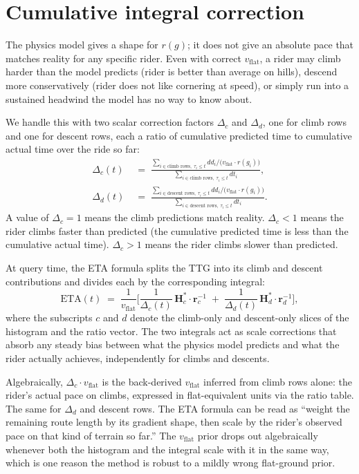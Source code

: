 \documentclass[11pt,a4paper]{article}
\begin{document}
\section{Cumulative integral correction}
\label{sec:integral}

The physics model gives a shape for $r(g)$; it does not give an
absolute pace that matches reality for any specific rider. Even with
correct $v_{\text{flat}}$, a rider may climb harder than the model
predicts (rider is better than average on hills), descend more
conservatively (rider does not like cornering at speed), or simply
run into a sustained headwind the model has no way to know about.

We handle this with two scalar correction factors $\Delta_c$ and
$\Delta_d$, one for climb rows and one for descent rows, each a ratio
of cumulative predicted time to cumulative actual time over the ride
so far:
\begin{align}
\Delta_c(t)
&\;=\;
\frac{\sum_{i \in \text{climb rows},\; \tau_i \le t} dd_i / \big(v_{\text{flat}} \cdot r(g_i)\big)}
     {\sum_{i \in \text{climb rows},\; \tau_i \le t} dt_i}, \\[1ex]
\Delta_d(t)
&\;=\;
\frac{\sum_{i \in \text{descent rows},\; \tau_i \le t} dd_i / \big(v_{\text{flat}} \cdot r(g_i)\big)}
     {\sum_{i \in \text{descent rows},\; \tau_i \le t} dt_i}.
\end{align}
A value of $\Delta_c = 1$ means the climb predictions match reality.
$\Delta_c < 1$ means the rider climbs faster than predicted (the
cumulative predicted time is less than the cumulative actual time).
$\Delta_c > 1$ means the rider climbs slower than predicted.

At query time, the ETA formula splits the TTG into its climb and
descent contributions and divides each by the corresponding integral:
\begin{equation}
\label{eq:eta}
\text{ETA}(t) \;=\;
 \frac{1}{v_{\text{flat}}} \Big[\frac{1}{\Delta_c(t)}\,\mathbf{H}^{\ast}_c \cdot \mathbf{r}_c^{-1}
                   \;+\; \frac{1}{\Delta_d(t)}\,\mathbf{H}^{\ast}_d \cdot \mathbf{r}_d^{-1}\Big],
\end{equation}
where the subscripts $c$ and $d$ denote the climb-only and
descent-only slices of the histogram and the ratio vector. The two
integrals act as scale corrections that absorb any steady bias between
what the physics model predicts and what the rider actually achieves,
independently for climbs and descents.

Algebraically, $\Delta_c \cdot v_{\text{flat}}$ is the back-derived
$v_{\text{flat}}$ inferred from climb rows alone: the rider's actual
pace on climbs, expressed in flat-equivalent units via the ratio
table. The same for $\Delta_d$ and descent rows. The ETA formula can
be read as ``weight the remaining route length by its gradient shape,
then scale by the rider's observed pace on that kind of terrain so
far.'' The $v_{\text{flat}}$ prior drops out algebraically whenever
both the histogram and the integral scale with it in the same way,
which is one reason the method is robust to a mildly wrong flat-ground
prior.
\end{document}
